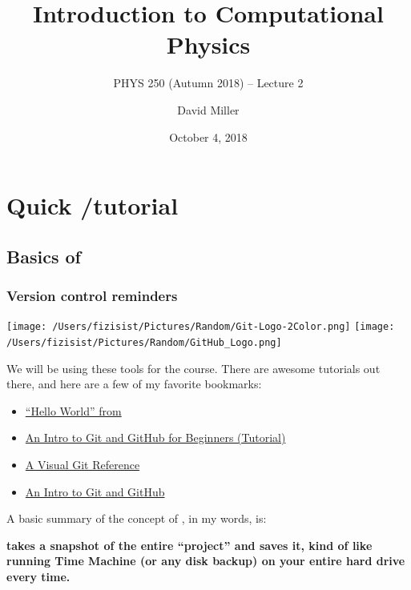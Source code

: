 \documentclass[hyperref={colorlinks=true}]{beamer}
\title[PHYS 250 (Autumn 2018) -- Lecture 1]{Introduction to Computational Physics}
\subtitle{PHYS 250 (Autumn 2018) -- Lecture 2}
\author[D.W.~Miller]{David Miller}
\institute[EFI, Chicago] 
{
  Department of Physics and the Enrico Fermi Institute\\
  University of Chicago
}
\date[October 4, 2018]{October 4, 2018}
\begin{document}

{
\begin{frame}
  \titlepage
\end{frame}
}

\section[Quick \git/\github tutorial]{Quick \git/\github tutorial}

\subsection[Basics of \git]{Basics of \git}

\begin{frame}%
  \frametitle{Version control reminders}
  
  \begin{center}
    \texttt{[image: /Users/fizisist/Pictures/Random/Git-Logo-2Color.png]}
    \texttt{[image: /Users/fizisist/Pictures/Random/GitHub\_Logo.png]}
  \end{center}

  We will be using these tools for the course. There are  awesome tutorials out there, and here are a few of my favorite bookmarks:
  
  \begin{itemize}
    \item \href{https://guides.github.com/activities/hello-world/}{``Hello World'' from \github}
    \item \href{https://product.hubspot.com/blog/git-and-github-tutorial-for-beginners}{An Intro to Git and GitHub for Beginners (Tutorial)}
    \item \href{http://marklodato.github.io/visual-git-guide/index-en.html}{A Visual Git Reference}
    \item \href{https://medium.com/@abhishekj/an-intro-to-git-and-github-1a0e2c7e3a2f}{An Intro to Git and GitHub}
  \end{itemize}

  A basic summary of the concept of \git, in my words, is:
  
  \begin{ucblock}{}
    \centering \textbf{\git takes a snapshot of the entire ``project'' and saves it, kind of like running Time Machine (or any disk backup) on your entire hard drive every time.}
  \end{ucblock}


\end{frame}
\end{document}
